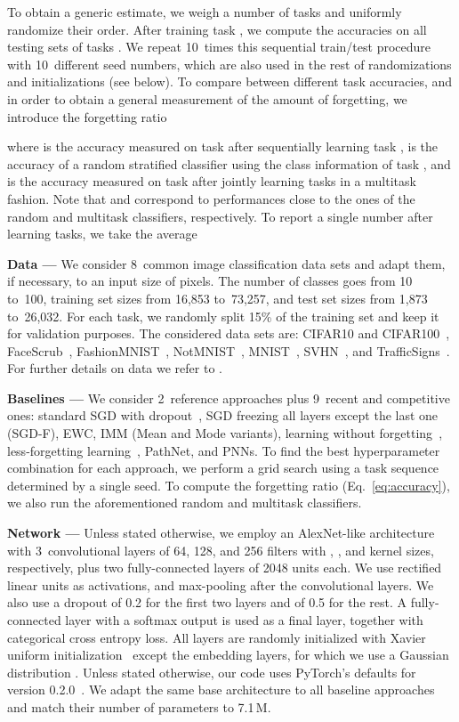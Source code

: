 To obtain a generic estimate, we weigh a number of tasks and uniformly randomize their order. After training task , we compute the accuracies on all testing sets of tasks . We repeat 10~times this sequential train/test procedure with 10~different seed numbers, which are also used in the rest of randomizations and initializations (see below). To compare between different task accuracies, and in order to obtain a general measurement of the amount of forgetting, we introduce the forgetting ratio

where  is the accuracy measured on task  after sequentially learning task ,  is the accuracy of a random stratified classifier using the class information of task , and  is the accuracy measured on task  after jointly learning  tasks in a multitask fashion. Note that  and  correspond to performances close to the ones of the random and multitask classifiers, respectively. To report a single number after learning  tasks, we take the average


\textbf{Data ---} We consider 8~common image classification data sets and adapt them, if necessary, to an input size of  pixels. The number of classes goes from 10 to~100, training set sizes from 16,853 to~73,257, and test set sizes from 1,873 to~26,032. For each task, we randomly split 15\% of the training set and keep it for validation purposes. The considered data sets are: CIFAR10 and CIFAR100~\cite{krizhevsky2009learning}, FaceScrub~\cite{ng2014data}, FashionMNIST~\cite{Xiao17ARXIV}, NotMNIST~\cite{Bulatov11TR}, MNIST~\cite{LeCun98PIEEE}, SVHN~\cite{Netzer2011}, and TrafficSigns~\cite{Stallkamp2011IJCNN}. For further details on data we refer to . 

\textbf{Baselines ---} We consider 2~reference approaches plus 9~recent and competitive ones: standard SGD with dropout~\cite{Goodfellow14ICLR}, SGD freezing all layers except the last one (SGD-F), EWC, IMM (Mean and Mode variants), learning without forgetting~\citep[LWF;][]{Li17PAMI}, less-forgetting learning~\citep[LFL;][]{Jung16ARXIV}, PathNet, and PNNs. To find the best hyperparameter combination for each approach, we perform a grid search using a task sequence determined by a single seed. To compute the forgetting ratio  (Eq.~\ref{eq:accuracy}), we also run the aforementioned random and multitask classifiers.

\textbf{Network ---} Unless stated otherwise, we employ an AlexNet-like architecture~\cite{krizhevsky2012imagenet} with 3~convolutional layers of 64, 128, and 256 filters with , , and  kernel sizes, respectively, plus two fully-connected layers of 2048 units each. We use rectified linear units as activations, and  max-pooling after the convolutional layers. We also use a dropout of 0.2 for the first two layers and of 0.5 for the rest. A fully-connected layer with a softmax output is used as a final layer, together with categorical cross entropy loss. All layers are randomly initialized with Xavier uniform initialization~\cite{glorot2010understanding} except the embedding layers, for which we use a Gaussian distribution . Unless stated otherwise, our code uses PyTorch's defaults for version 0.2.0~\cite{Paszke17NIPSW}. We adapt the same base architecture to all baseline approaches and match their number of parameters to 7.1\,M. 

